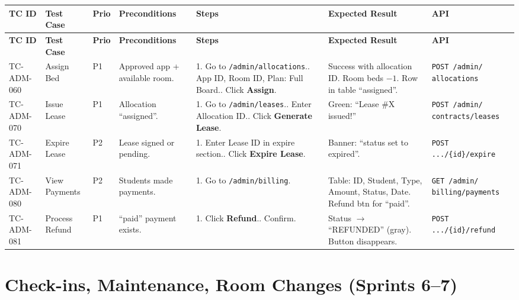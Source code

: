 \documentclass[12pt,a4paper]{article}
\begin{document}
\begin{longtable}{L{2cm} L{3cm} L{1cm} L{4cm} L{5.5cm} L{5.5cm} L{3cm}}
\toprule
\textbf{TC ID} & \textbf{Test Case} & \textbf{Prio} & \textbf{Preconditions} & \textbf{Steps} & \textbf{Expected Result} & \textbf{API} \\
\midrule
\endfirsthead \toprule \textbf{TC ID} & \textbf{Test Case} & \textbf{Prio} & \textbf{Preconditions} & \textbf{Steps} & \textbf{Expected Result} & \textbf{API} \\ \midrule \endhead \bottomrule \endfoot

TC-ADM-060 & Assign Bed & P1 & Approved app + available room. & 1. Go to \texttt{/admin/allocations}.. App ID, Room ID, Plan: Full Board.. Click \textbf{Assign}. & Success with allocation ID. Room beds $-1$. Row in table ``assigned''. & \texttt{POST /admin/ allocations} \\
\midrule
TC-ADM-070 & Issue Lease & P1 & Allocation ``assigned''. & 1. Go to \texttt{/admin/leases}.. Enter Allocation ID.. Click \textbf{Generate Lease}. & Green: ``Lease \#X issued!'' & \texttt{POST /admin/ contracts/leases} \\
\midrule
TC-ADM-071 & Expire Lease & P2 & Lease signed or pending. & 1. Enter Lease ID in expire section.. Click \textbf{Expire Lease}. & Banner: ``status set to expired''. & \texttt{POST .../\{id\}/expire} \\
\midrule
TC-ADM-080 & View Payments & P2 & Students made payments. & 1. Go to \texttt{/admin/billing}. & Table: ID, Student, Type, Amount, Status, Date. Refund btn for ``paid''. & \texttt{GET /admin/ billing/payments} \\
\midrule
TC-ADM-081 & Process Refund & P1 & ``paid'' payment exists. & 1. Click \textbf{Refund}.. Confirm. & Status $\rightarrow$ ``REFUNDED'' (gray). Button disappears. & \texttt{POST .../\{id\}/refund} \\
\end{longtable}

\section{Check-ins, Maintenance, Room Changes (Sprints 6--7)}
\end{document}
